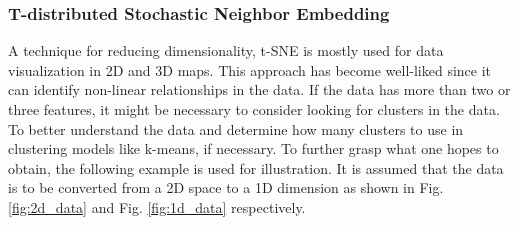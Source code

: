 \subsubsection{T-distributed Stochastic Neighbor Embedding}
A technique for reducing dimensionality, \ac{t-SNE} is mostly used for data visualization in 2D and 3D maps. This approach has become well-liked since it can identify non-linear relationships in the data. If the data has more than two or three features, it might be necessary to consider looking for clusters in the data. To better understand the data and determine how many clusters to use in clustering models like k-means, if necessary. To further grasp what one hopes to obtain, the following example is used for illustration. It is assumed that the data is to be converted from a 2D space to a 1D dimension as shown in Fig. \ref{fig:2d_data} and Fig. \ref{fig:1d_data} respectively.\cite{van2008visualizing}

